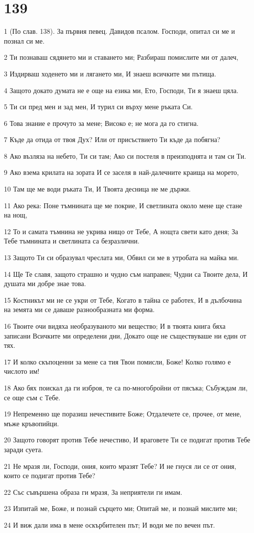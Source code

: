 \chapter{139}

\par 1 (По слав. 138). За първия певец. Давидов псалом. Господи, опитал си ме и познал си ме.
\par 2 Ти познаваш сядянето ми и ставането ми; Разбираш помислите ми от далеч,
\par 3 Издирваш ходенето ми и лягането ми, И знаеш всичките ми пътища.
\par 4 Защото докато думата не е още на езика ми, Ето, Господи, Ти я знаеш цяла.
\par 5 Ти си пред мен и зад мен, И турил си върху мене ръката Си.
\par 6 Това знание е прочуто за мене; Високо е; не мога да го стигна.
\par 7 Къде да отида от твоя Дух? Или от присъствието Ти къде да побягна?
\par 8 Ако възляза на небето, Ти си там; Ако си постеля в преизподнята и там си Ти.
\par 9 Ако взема крилата на зората И се заселя в най-далечните краища на морето,
\par 10 Там ще ме води ръката Ти, И Твоята десница не ме държи.
\par 11 Ако река: Поне тъмнината ще ме покрие, И светлината около мене ще стане на нощ,
\par 12 То и самата тъмнина не укрива нищо от Тебе, А нощта свети като деня; За Тебе тъмнината и светлината са безразлични.
\par 13 Защото Ти си образувал чреслата ми, Обвил си ме в утробата на майка ми.
\par 14 Ще Те славя, защото страшно и чудно съм направен; Чудни са Твоите дела, И душата ми добре знае това.
\par 15 Костникът ми не се укри от Тебе, Когато в тайна се работех, И в дълбочина на земята ми се даваше разнообразната ми форма.
\par 16 Твоите очи видяха необразуваното ми вещество; И в твоята книга бяха записани Всичките ми определени дни, Докато още не съществуваше ни един от тях.
\par 17 И колко скъпоценни за мене са тия Твои помисли, Боже! Колко голямо е числото им!
\par 18 Ако бях поискал да ги изброя, те са по-многобройни от пясъка; Събуждам ли, се още съм с Тебе.
\par 19 Непременно ще поразиш нечестивите Боже; Отдалечете се, прочее, от мене, мъже кръвопийци.
\par 20 Защото говорят против Тебе нечестиво, И враговете Ти се подигат против Тебе заради суета.
\par 21 Не мразя ли, Господи, ония, които мразят Тебе? И не гнуся ли се от ония, които се подигат против Тебе?
\par 22 Със съвършена образа ги мразя, За неприятели ги имам.
\par 23 Изпитай ме, Боже, и познай сърцето ми; Опитай ме, и познай мислите ми;
\par 24 И виж дали има в мене оскърбителен път; И води ме по вечен път.

